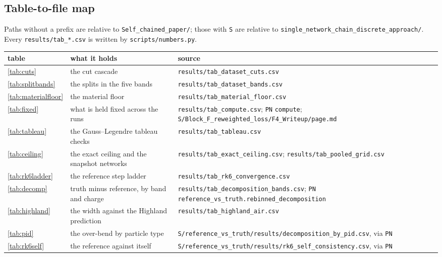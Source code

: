 \documentclass[11pt,a4paper]{article}
\begin{document}
\subsection*{Table-to-file map}

Paths without a prefix are relative to \texttt{Self\_chained\_paper/}; those
with \texttt{S} are relative to
\texttt{single\_network\_chain\_discrete\_approach/}. Every
\texttt{results/tab\_*.csv} is written by \texttt{scripts/numbers.py}.

\begin{table}[htbp]
  \centering
  \scriptsize
  \setlength{\tabcolsep}{2pt}
  \begin{tabular}{@{}l p{4.0cm} p{8.8cm}@{}}
    \toprule
    table & what it holds & source \\
    \midrule
    \ref{tab:cuts} & the cut cascade & \texttt{results/tab\_dataset\_cuts.csv} \\
    \ref{tab:splitbands} & the splits in the five bands & \texttt{results/tab\_dataset\_bands.csv} \\
    \ref{tab:materialfloor} & the material floor & \texttt{results/tab\_material\_floor.csv} \\
    \ref{tab:fixed} & what is held fixed across the runs
      & \texttt{results/tab\_compute.csv}; \texttt{PN} \texttt{compute}; \texttt{S/Block\_F\_reweighted\_loss/F4\_Writeup/page.md} \\
    \ref{tab:tableau} & the Gauss--Legendre tableau checks & \texttt{results/tab\_tableau.csv} \\
    \ref{tab:ceiling} & the exact ceiling and the snapshot networks
      & \texttt{results/tab\_exact\_ceiling.csv}; \texttt{results/tab\_pooled\_grid.csv} \\
    \ref{tab:rk6ladder} & the reference step ladder & \texttt{results/tab\_rk6\_convergence.csv} \\
    \ref{tab:decomp} & truth minus reference, by band and charge
      & \texttt{results/tab\_decomposition\_bands.csv}; \texttt{PN} \texttt{reference\_vs\_truth.rebinned\_decomposition} \\
    \ref{tab:highland} & the width against the Highland prediction & \texttt{results/tab\_highland\_air.csv} \\
    \ref{tab:pid} & the over-bend by particle type
      & \texttt{S/reference\_vs\_truth/results/decomposition\_by\_pid.csv}, via \texttt{PN} \\
    \ref{tab:rk6self} & the reference against itself
      & \texttt{S/reference\_vs\_truth/results/rk6\_self\_consistency.csv}, via \texttt{PN} \\

\end{tabular}
\end{table}
\end{document}
